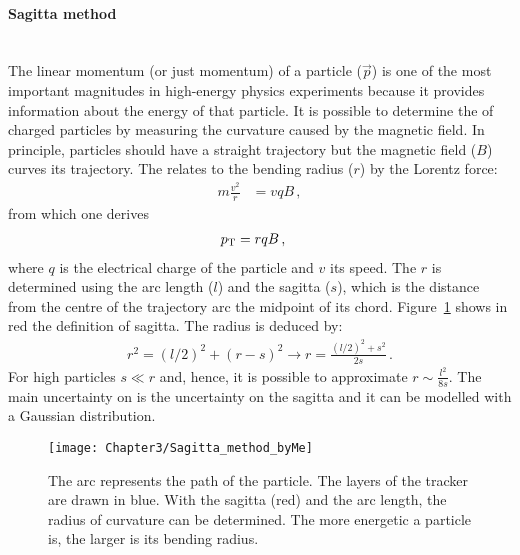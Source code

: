 \paragraph{Sagitta method}\mbox{}\\
\label{sec:Chap3:Reco:Sagitta}
The linear momentum (or just momentum) of a particle ($\overrightarrow{p}$) is one of the most important 
magnitudes in high-energy physics experiments because it provides information
about the energy of that particle. %
It is possible to determine the \pT of charged particles
by measuring the curvature caused by the magnetic field. In principle,
particles should have a straight trajectory but the magnetic field ($B$) curves its trajectory.
The \pT relates to the bending radius ($r$) by the Lorentz force:
\begin{align*}
	m\frac{v^2}{r} & = vqB\, , 
\end{align*}
from which one derives 
\begin{align*}
	p_{\text{T}} &=rqB \, ,
\end{align*}
where $q$ is the electrical charge of the particle and $v$ its speed. The $r$ is determined using
the arc length ($l$) and 
the sagitta ($s$), which is the distance from the centre of the trajectory arc the midpoint of its chord. Figure~\ref{fig:ChapReco:Sagitta} shows
in red the definition of sagitta. The radius is deduced by:
\begin{align*}
	r^{2}  = (l/2)^{2} + (r-s)^{2} \rightarrow r = \frac{(l/2)^2+s^2}{2s}\, .
\end{align*}
For high \pT particles $s \ll r$ and, hence, it is possible to approximate $r\sim\frac{l^2}{8s}$. 
The main uncertainty on \pT is the uncertainty on the sagitta and it can be
modelled with a Gaussian distribution.

\begin{figure}[h]
\centering
\texttt{[image: Chapter3/Sagitta\_method\_byMe]}
\caption{The arc represents the path of the particle. The layers of the tracker 
are drawn in blue. 
With the sagitta (red) and 
the arc length, the radius of curvature can be determined. The more energetic a
particle is, the larger is its bending radius.}
\label{fig:ChapReco:Sagitta}
\end{figure}



